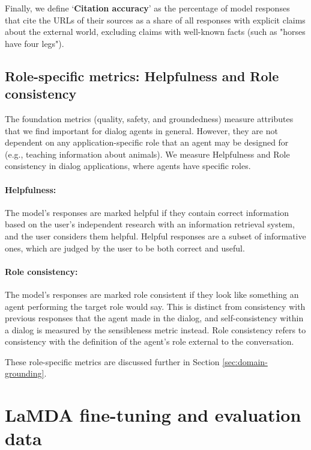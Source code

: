 \documentclass{article}
\def\knowledgetool{information retrieval system\xspace}
\begin{document}
Finally, we define `{\bf Citation accuracy}' as the percentage of model responses that cite the URLs of their sources as a share of all responses with explicit claims about the external world, excluding claims with well-known facts (such as "horses have four legs").

\subsection{Role-specific metrics: Helpfulness and Role consistency}
\label{sec:metrics-role}

The foundation metrics (quality, safety, and groundedness) measure attributes that we find important for dialog agents in general. However, they are not dependent on any application-specific role that an agent may be designed for (e.g., teaching information about animals). We measure Helpfulness and Role consistency in dialog applications, where agents have specific roles.

\paragraph{Helpfulness:} The model’s responses are marked helpful if they contain correct information based on the user’s independent research with an \knowledgetool, and the user considers them helpful. Helpful responses are a subset of informative ones, which are judged by the user to be both correct and useful.

\paragraph{Role consistency:} The model’s responses are marked role consistent if they look like something an agent performing the target role would say. This is distinct from consistency with previous responses that the agent made in the dialog, and self-consistency within a dialog is measured by the sensibleness metric instead. Role consistency refers to consistency with the definition of the agent’s role external to the conversation.

These role-specific metrics are discussed further in Section \ref{sec:domain-grounding}.

\section{LaMDA fine-tuning and evaluation data}
\label{sec:data}
\end{document}
